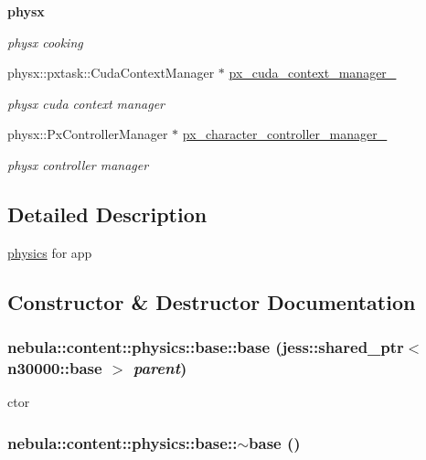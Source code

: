 \begin{Indent}{\bf physx}
\begin{DoxyCompactItemize}
\begin{DoxyCompactList}\small\item\em physx cooking \item\end{DoxyCompactList}\item 
physx::pxtask::CudaContextManager $\ast$ \hyperlink{classnebula_1_1content_1_1physics_1_1base_a8013955852d69be077b892e62e65e609}{px\_\-cuda\_\-context\_\-manager\_\-}
\begin{DoxyCompactList}\small\item\em physx cuda context manager \item\end{DoxyCompactList}\item 
physx::PxControllerManager $\ast$ \hyperlink{classnebula_1_1content_1_1physics_1_1base_a05e856150d8220d4b8d1f6db1041bf59}{px\_\-character\_\-controller\_\-manager\_\-}
\begin{DoxyCompactList}\small\item\em physx controller manager \item\end{DoxyCompactList}\end{DoxyCompactItemize}
\end{Indent}


\subsection{Detailed Description}
\hyperlink{namespacenebula_1_1content_1_1physics}{physics} for app 

\subsection{Constructor \& Destructor Documentation}
\hypertarget{classnebula_1_1content_1_1physics_1_1base_a800356f190e4a2e4aaccf53d3fd1e8bf}{
\subsubsection[{base}]{\setlength{\rightskip}{0pt plus 5cm}nebula::content::physics::base::base (jess::shared\_\-ptr$<$ {\bf n30000::base} $>$ {\em parent})}}
\label{classnebula_1_1content_1_1physics_1_1base_a800356f190e4a2e4aaccf53d3fd1e8bf}


ctor \hypertarget{classnebula_1_1content_1_1physics_1_1base_a980739fcd78d28fbbe4b02f46b3cd97e}{
\subsubsection[{$\sim$base}]{\setlength{\rightskip}{0pt plus 5cm}nebula::content::physics::base::$\sim$base ()}}
\label{classnebula_1_1content_1_1physics_1_1base_a980739fcd78d28fbbe4b02f46b3cd97e}


